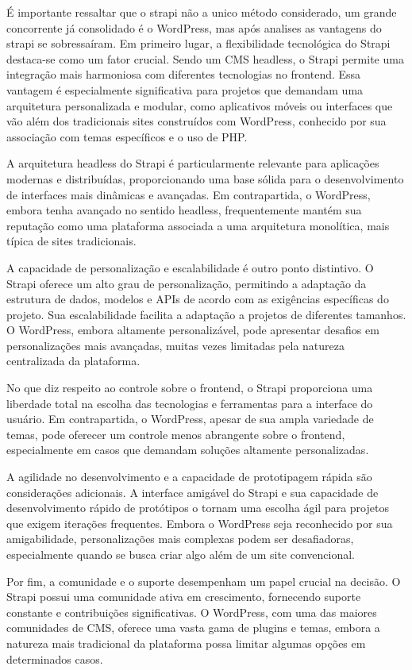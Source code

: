 \documentclass[12pt,twoside,english,brazilian]{article}
\begin{document}
 É importante ressaltar que o strapi não a unico método considerado, um grande concorrente já consolidado é o WordPress, mas após analises as vantagens do strapi se sobressaíram. Em primeiro lugar, a flexibilidade tecnológica do Strapi destaca-se como um fator crucial. Sendo um CMS headless, o Strapi permite uma integração mais harmoniosa com diferentes tecnologias no frontend. Essa vantagem é especialmente significativa para projetos que demandam uma arquitetura personalizada e modular, como aplicativos móveis ou interfaces que vão além dos tradicionais sites construídos com WordPress, conhecido por sua associação com temas específicos e o uso de PHP.

A arquitetura headless do Strapi é particularmente relevante para aplicações modernas e distribuídas, proporcionando uma base sólida para o desenvolvimento de interfaces mais dinâmicas e avançadas. Em contrapartida, o WordPress, embora tenha avançado no sentido headless, frequentemente mantém sua reputação como uma plataforma associada a uma arquitetura monolítica, mais típica de sites tradicionais.

A capacidade de personalização e escalabilidade é outro ponto distintivo. O Strapi oferece um alto grau de personalização, permitindo a adaptação da estrutura de dados, modelos e APIs de acordo com as exigências específicas do projeto. Sua escalabilidade facilita a adaptação a projetos de diferentes tamanhos. O WordPress, embora altamente personalizável, pode apresentar desafios em personalizações mais avançadas, muitas vezes limitadas pela natureza centralizada da plataforma.

No que diz respeito ao controle sobre o frontend, o Strapi proporciona uma liberdade total na escolha das tecnologias e ferramentas para a interface do usuário. Em contrapartida, o WordPress, apesar de sua ampla variedade de temas, pode oferecer um controle menos abrangente sobre o frontend, especialmente em casos que demandam soluções altamente personalizadas.

A agilidade no desenvolvimento e a capacidade de prototipagem rápida são considerações adicionais. A interface amigável do Strapi e sua capacidade de desenvolvimento rápido de protótipos o tornam uma escolha ágil para projetos que exigem iterações frequentes. Embora o WordPress seja reconhecido por sua amigabilidade, personalizações mais complexas podem ser desafiadoras, especialmente quando se busca criar algo além de um site convencional.

Por fim, a comunidade e o suporte desempenham um papel crucial na decisão. O Strapi possui uma comunidade ativa em crescimento, fornecendo suporte constante e contribuições significativas. O WordPress, com uma das maiores comunidades de CMS, oferece uma vasta gama de plugins e temas, embora a natureza mais tradicional da plataforma possa limitar algumas opções em determinados casos.
\end{document}
